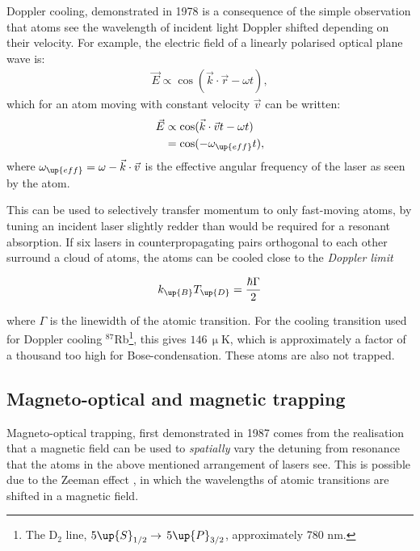 Doppler cooling, demonstrated in 1978 \cite{wineland_radiation-pressure_1978} is a consequence of the simple observation that atoms see the wavelength of incident light Doppler shifted depending on their velocity. For example, the electric field of a linearly polarised optical plane wave is:
\begin{align}
\vec E \propto \cos(\vec k \cdot \vec r - \omega t),
\end{align}
which for an atom moving with constant velocity $\vec v$ can be written:
\begin{align}
\vec E &\propto \cos(\vec k \cdot \vec v t - \omega t)\\
&= \cos(- \omega_\up{eff} t),
\end{align}
where $\omega_\up{eff} = \omega - \vec k \cdot \vec v$ is the effective angular frequency of the laser as seen by the atom.

This can be used to selectively transfer momentum to only fast-moving atoms, by tuning an incident laser slightly redder than would be required for a resonant absorption. If six lasers in counterpropagating pairs orthogonal to each other surround a cloud of atoms, the atoms can be cooled close to the \emph{Doppler limit} \cite[p 58]{metcalf_laser_1999}

\begin{equation}
k_\up{B} T_\up{D} = \frac{\hbar\Gamma}2
\end{equation}

where $\Gamma$ is the linewidth of the atomic transition. For the cooling transition used for Doppler cooling $^{87}$Rb\footnote{The D$_2$ line, $5\up{S}_{1/2}\rightarrow$ $5\up{P}_{3/2}$, approximately 780 nm.}, this gives $146\,\upmu$K, which is approximately a factor of a thousand too high for Bose-condensation. These atoms are also not trapped.

\subsection{Magneto-optical and magnetic trapping}

Magneto-optical trapping, first demonstrated in 1987 \cite{raab_trapping_1987} comes from the realisation that a magnetic field can be used to \emph{spatially} vary the detuning from resonance that the atoms in the above mentioned arrangement of lasers see. This is possible due to the Zeeman effect \cite{zeeman_influence_1897}, in which the wavelengths of atomic transitions are shifted in a magnetic field.

